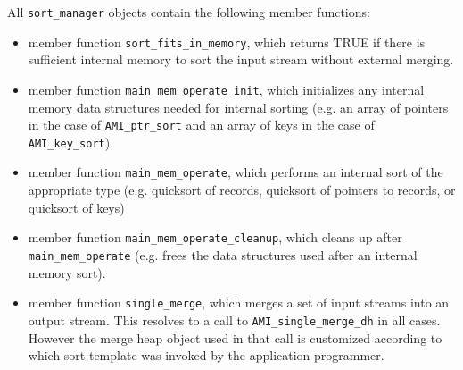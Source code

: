 All \lstinline|sort_manager| objects contain the following
member functions:
\begin{itemize}
    \item member function \lstinline|sort_fits_in_memory|,
    which returns TRUE if there is sufficient internal
    memory to sort the input stream without external
    merging.
    
    \item member function \lstinline|main_mem_operate_init|,
    which initializes any internal memory data structures
    needed for internal sorting (e.g. an array of pointers
    in the case of \lstinline|AMI_ptr_sort| and an array of keys
    in the case of \lstinline|AMI_key_sort|).
    
    \item member function \lstinline|main_mem_operate|, which
    performs an internal sort of the appropriate type (e.g.
    quicksort of records, quicksort of pointers to records,
    or quicksort of keys)
    
    \item member function \lstinline|main_mem_operate_cleanup|,
    which cleans up after \lstinline|main_mem_operate| (e.g.
    frees the data structures used after an internal memory
    sort).
    
    \item member function \lstinline|single_merge|, which merges
    a set of input streams into an output stream. This
    resolves to a call to \lstinline|AMI_single_merge_dh| in
    all cases. However the merge heap object used in that
    call is customized according to which sort template was
    invoked by the application programmer.

\end{itemize}

